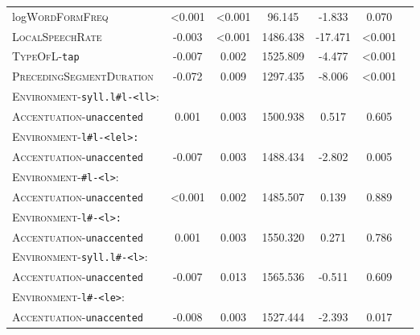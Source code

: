 \begin{table}
{\begin{tabular}{lSSSSSS}
		log\textsc{WordFormFreq }& \color{lsLightGray} <0.001 & \color{lsLightGray} <0.001 & \color{lsLightGray} 96.145 & \color{lsLightGray} -1.833 & \color{lsLightGray} 0.070 \\ 
		
		\textsc{LocalSpeechRate} & -0.003 &<0.001  & 1486.438 & -17.471 &<0.001 \\ 
		
		
		\textsc{TypeOfL}-\texttt{tap} & -0.007 & 0.002 & 1525.809 & -4.477 & <0.001 \\ 
		
		\textsc{PrecedingSegmentDuration} & -0.072 & 0.009 & 1297.435 & -8.006 & <0.001 \\ 
		
		\textsc{Environment}-\texttt{syll.l\#l-<ll>}:&&&&&\\
		\textsc{Accentuation}-\texttt{unaccented} & \color{lsLightGray} 0.001 & \color{lsLightGray} 0.003 & \color{lsLightGray} 1500.938 &\color{lsLightGray}  0.517 & \color{lsLightGray} 0.605 \\ 
		
		\textsc{Environment}-\texttt{l\#l-<lel>:}&&&&&\\
		\textsc{Accentuation}-\texttt{unaccented} & -0.007 & 0.003 & 1488.434 & -2.802 & 0.005 \\
		
		\textsc{Environment}-\texttt{\#l-<l>}:&&&&&\\
		\textsc{Accentuation}-\texttt{unaccented} & \color{lsLightGray} <0.001  & \color{lsLightGray} 0.002 & \color{lsLightGray} 1485.507 & \color{lsLightGray} 0.139 & \color{lsLightGray} 0.889 \\ 
		
		\textsc{Environment}-\texttt{l\#-<l>:}&&&&&\\
		\textsc{Accentuation}-\texttt{unaccented} & \color{lsLightGray} 0.001 & \color{lsLightGray} 0.003 & \color{lsLightGray} 1550.320 &  \color{lsLightGray} 0.271 &\color{lsLightGray}  0.786 \\ 
		
		\textsc{Environment}-\texttt{syll.l\#-<l>}:&&&&&\\
		\textsc{Accentuation}-\texttt{unaccented} &\color{lsLightGray}  -0.007 &\color{lsLightGray}  0.013 & \color{lsLightGray} 1565.536 &\color{lsLightGray}  -0.511 &\color{lsLightGray}  0.609 \\ 
		
		\textsc{Environment}-\texttt{l\#-<le>}:&&&&&\\
		\textsc{Accentuation}-\texttt{unaccented} & -0.008 & 0.003 & 1527.444 & -2.393 & 0.017 \\ 
		

\end{tabular}}
\end{table}
